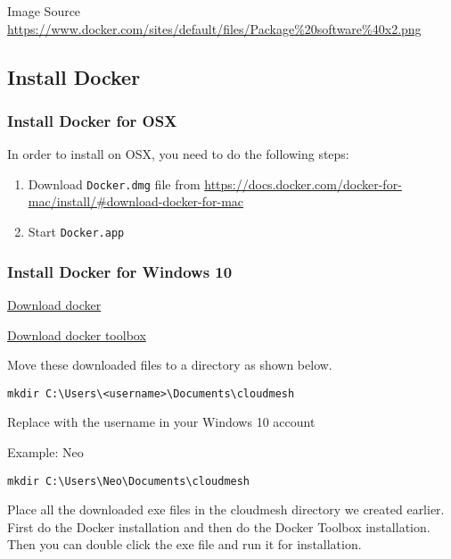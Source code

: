 Image Source
\url{https://www.docker.com/sites/default/files/Package\%20software\%40x2.png}

\subsection{Install Docker}

\subsubsection{Install Docker for OSX}

In order to install on OSX, you need to do the following steps:

\begin{enumerate}
\def\labelenumi{\arabic{enumi}.}
\item
  Download \texttt{Docker.dmg} file from
  \href{}{https://docs.docker.com/docker-for-mac/install/\#download-docker-for-mac}
\item
  Start \texttt{Docker.app}
\end{enumerate}

\subsubsection{Install Docker for Windows
10}\label{install-docker-for-windows-10}

\href{https://download.docker.com/win/stable/Docker\%20for\%20Windows\%20Installer.exe}{Download
docker}

\href{https://download.docker.com/win/stable/DockerToolbox.exe}{Download
docker toolbox}

Move these downloaded files to a directory as shown below.

\begin{verbatim}
mkdir C:\Users\<username>\Documents\cloudmesh
\end{verbatim}

Replace with the username in your Windows 10 account

Example: Neo

\begin{verbatim}
mkdir C:\Users\Neo\Documents\cloudmesh
\end{verbatim}

Place all the downloaded exe files in the cloudmesh directory we created
earlier. First do the Docker installation and then do the Docker Toolbox
installation. Then you can double click the exe file and run it for
installation.


